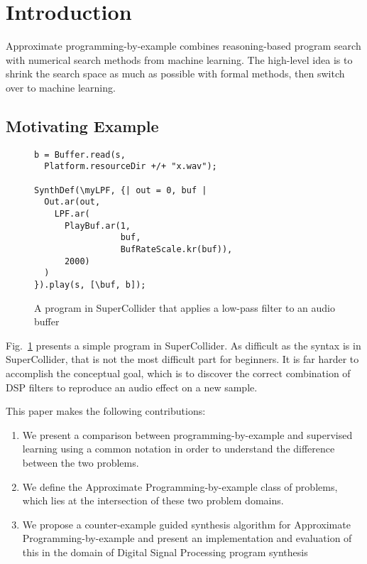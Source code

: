 
\section{Introduction}

Approximate programming-by-example combines reasoning-based program search with numerical search methods from machine learning.
The high-level idea is to shrink the search space as much as possible with formal methods, then switch over to machine learning.


\subsection{Motivating Example}

\begin{figure}
\begin{lstlisting}
b = Buffer.read(s, 
  Platform.resourceDir +/+ "x.wav");

SynthDef(\myLPF, {| out = 0, buf |
  Out.ar(out,
    LPF.ar(
      PlayBuf.ar(1, 
                 buf, 
                 BufRateScale.kr(buf)),
      2000)
  )
}).play(s, [\buf, b]);
\end{lstlisting}
\caption{A program in SuperCollider that applies a low-pass filter to an audio buffer}
\label{fig:sc_code}
\end{figure}

Fig.~\ref{fig:sc_code} presents a simple program in SuperCollider.
As difficult as the syntax is in SuperCollider, that is not the most difficult part for beginners.
It is far harder to accomplish the conceptual goal, which is to discover the correct combination of DSP filters to reproduce an audio effect on a new sample.



This paper makes the following contributions:

\begin{enumerate}
\item We present a comparison between programming-by-example and supervised learning using a common notation in order to understand the difference between the two problems.
\item We define the Approximate Programming-by-example class of problems, which lies at the intersection of these two problem domains.
\item We propose a counter-example guided synthesis algorithm for Approximate Programming-by-example and present an implementation and evaluation of this in the domain of Digital Signal Processing program synthesis 
\end{enumerate}


